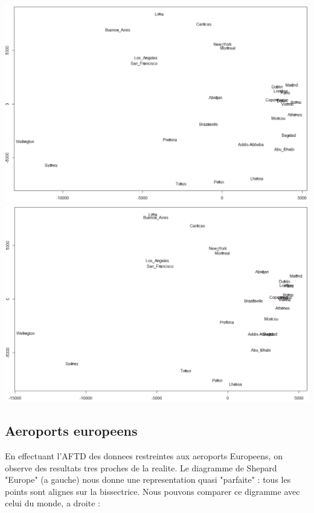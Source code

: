 \documentclass[a4paper,11pt]{article}
\begin{document}
\hspace{-2.3cm} 
\includegraphics[width=.6\textwidth]{Exo3/sammon.pdf}
\includegraphics[width=.6\textwidth]{Exo3/kruskal.pdf}\\

\subsection{Aeroports europeens}

\noindent En effectuant l'AFTD des donnees restreintes aux aeroports Europeens, on observe des resultats tres proches de la realite. Le diagramme de Shepard "Europe" (a gauche) nous donne une representation quasi "parfaite" :  tous les points sont alignes sur la bissectrice. Nous pouvons comparer ce digramme avec celui du monde, a droite :
\end{document}

